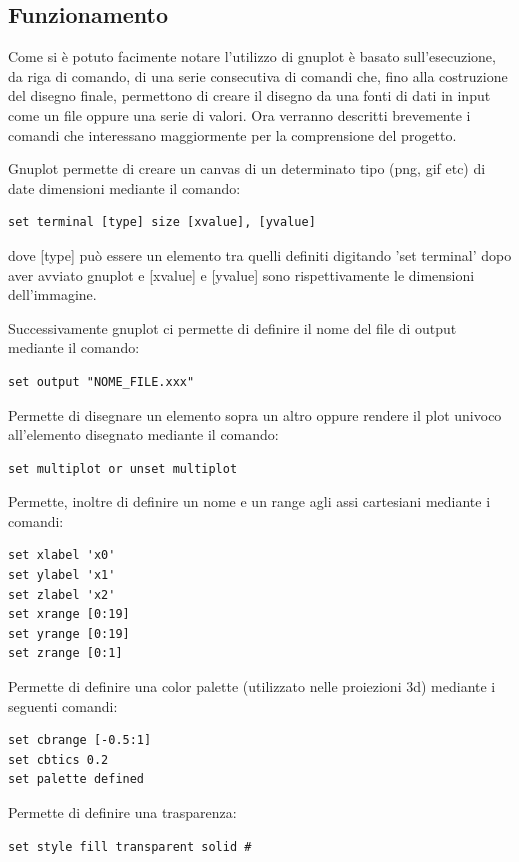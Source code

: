 \documentclass{article}
\begin{document}

\subsection{Funzionamento}
Come si è potuto facimente notare l'utilizzo di gnuplot è basato sull'esecuzione, da riga di comando, di una serie consecutiva di comandi che, fino alla costruzione del disegno finale, permettono di creare il disegno da una fonti di dati in input come un file oppure una serie di valori.
Ora verranno descritti brevemente i comandi che interessano maggiormente per la comprensione del progetto.\newline

Gnuplot permette di creare un canvas di un determinato tipo (png, gif etc) di date dimensioni mediante il comando:
\begin{verbatim}
set terminal [type] size [xvalue], [yvalue]
\end{verbatim}
dove [type] può essere un elemento tra quelli definiti digitando 'set terminal' dopo aver avviato gnuplot e [xvalue] e [yvalue] sono rispettivamente le dimensioni dell'immagine.\newline

Successivamente gnuplot ci permette di definire il nome del file di output mediante il comando:
\begin{verbatim}
set output "NOME_FILE.xxx"
\end{verbatim}

Permette di disegnare un elemento sopra un altro oppure rendere il plot univoco all'elemento disegnato mediante il comando:
\begin{verbatim}
set multiplot or unset multiplot
\end{verbatim}

Permette, inoltre di definire un nome e un range agli assi cartesiani mediante i comandi:
\begin{verbatim}
set xlabel 'x0'
set ylabel 'x1'
set zlabel 'x2'
set xrange [0:19] 
set yrange [0:19] 
set zrange [0:1] 
\end{verbatim}

Permette di definire una color palette (utilizzato nelle proiezioni 3d) mediante i seguenti comandi:
\begin{verbatim}
set cbrange [-0.5:1]
set cbtics 0.2
set palette defined
\end{verbatim}

Permette di definire una trasparenza:
\begin{verbatim}
set style fill transparent solid #
\end{verbatim}
\end{document}
